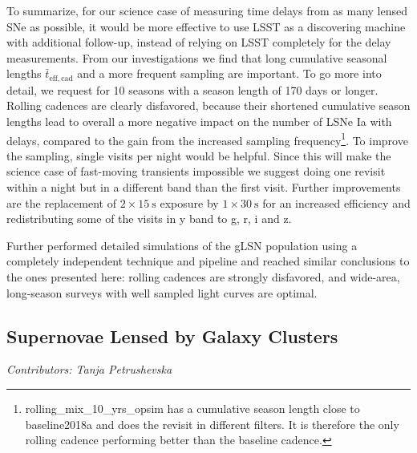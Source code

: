 To summarize, for our science case of measuring time delays from as many lensed SNe as possible, it would be more effective to use LSST as a discovering machine with additional follow-up, instead of relying on LSST completely for the delay measurements. From our investigations we find that long cumulative seasonal lengths $\bar{t}_\mathrm{eff,cad}$ and a more frequent sampling are important. To go more into detail, we request for 10 seasons with a season length of 170 days or longer. Rolling cadences are clearly disfavored, because their shortened cumulative season lengths lead to overall a more negative impact on the number of LSNe Ia with delays, compared to the gain from the increased sampling frequency\footnote{rolling\_mix\_10\_yrs\_opsim has a cumulative season length close to baseline2018a and does the revisit in different filters. It is therefore the only rolling cadence performing better than the baseline cadence.}. To improve the sampling, single visits per night would be helpful. Since this will make the science case of fast-moving transients impossible we suggest doing one revisit within a night but in a different band than the first visit. Further improvements are the replacement of $2 \times \SI{15}{\s}$ exposure by $1 \times \SI{30}{\s}$ for an increased efficiency and redistributing some of the visits in y band to g, r, i and z.
%

Further \cite{Goldstein:2018bue} performed detailed simulations of the gLSN population using a completely independent technique and pipeline and reached similar conclusions to the ones presented here: rolling cadences are strongly disfavored, and wide-area, long-season surveys with well sampled light curves are optimal.



\FloatBarrier
\subsection{Supernovae Lensed by Galaxy Clusters}
\textit{Contributors: Tanja Petrushevska}

